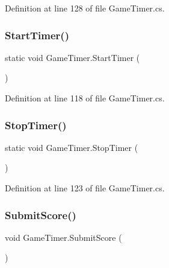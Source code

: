 Definition at line 128 of file Game\+Timer.\+cs.

\mbox{\label{class_game_timer_a9080e5f61142bb77abf558f025f03e77}} 
\subsubsection{\texorpdfstring{Start\+Timer()}{StartTimer()}}
{\footnotesize\ttfamily static void Game\+Timer.\+Start\+Timer (\begin{DoxyParamCaption}{ }\end{DoxyParamCaption})\hspace{0.3cm}{\ttfamily [static]}}



Definition at line 118 of file Game\+Timer.\+cs.

\mbox{\label{class_game_timer_a34ab1c3bf4fb8cced4111bf098c2dd63}} 
\subsubsection{\texorpdfstring{Stop\+Timer()}{StopTimer()}}
{\footnotesize\ttfamily static void Game\+Timer.\+Stop\+Timer (\begin{DoxyParamCaption}{ }\end{DoxyParamCaption})\hspace{0.3cm}{\ttfamily [static]}}



Definition at line 123 of file Game\+Timer.\+cs.

\mbox{\label{class_game_timer_a46d9f3e6d1b6686e3b815d8aa9a51fef}} 
\subsubsection{\texorpdfstring{Submit\+Score()}{SubmitScore()}}
{\footnotesize\ttfamily void Game\+Timer.\+Submit\+Score (\begin{DoxyParamCaption}{ }\end{DoxyParamCaption})}



